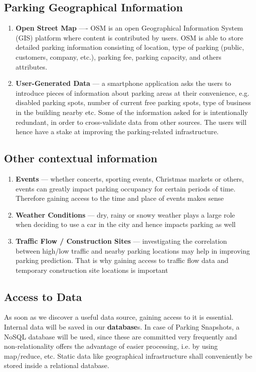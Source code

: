 \documentclass{article}
\begin{document}
\subsection{Parking Geographical Information}
\begin{enumerate}
\item \textbf{Open Street Map} ---- OSM is an open Geographical Information System (GIS) platform where content is contributed by users. OSM is able to store detailed parking information consisting of location, type of parking (public, customers, company, etc.), parking fee, parking capacity, and others attributes.
\item \textbf{User-Generated Data} --- a smartphone application asks the users to introduce pieces of information about parking areas at their convenience, e.g. disabled parking spots, number of current free parking spots, type of business in the building nearby etc. Some of the information asked for is intentionally redundant, in order to cross-validate data from other sources. The users will hence have a stake at improving the parking-related infrastructure. 
\end{enumerate}

\subsection{Other contextual information}
\begin{enumerate}
\item \textbf{Events} --- whether concerts, sporting events, Christmas markets or others, events can greatly impact parking occupancy for certain periods of time. Therefore gaining access to the time and place of events makes sense
\item \textbf{Weather Conditions} --- dry, rainy or snowy weather plays a large role when deciding to use a car in the city and hence impacts parking as well
\item \textbf{Traffic Flow / Construction Sites} --- investigating the correlation between high/low traffic and nearby parking locations may help in improving parking prediction. That is why gaining access to traffic flow data and temporary construction site locations is important
\end{enumerate}

\subsection{Access to Data}
As soon as we discover a useful data source, gaining access to it is essential. Internal data will be saved in our \textbf{database}s. In case of Parking Snapshots, a NoSQL database will be used, since these are committed very frequently and non-relationality offers the advantage of easier processing, i.e. by using map/reduce, etc. Static data like geographical infrastructure shall conveniently be stored inside a relational database.
\end{document}
